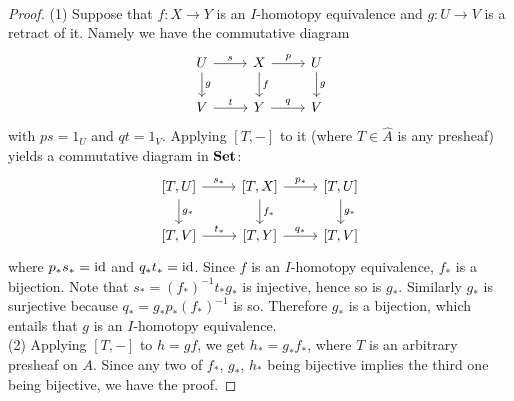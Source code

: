 \documentclass[a4paper,11pt,openany]{scrartcl}
\begin{document}
\ \\
\begin{proof}
(1) Suppose that $f\colon X\to Y$ is an $I$-homotopy equivalence and $g\colon U\to V$ is a retract of it. Namely we have the commutative diagram
\[
\begin{tikzcd}
U\arrow[r,"s"]\arrow[d,"g"]& X\arrow[r,"p"]\arrow[d,"f"]& U\arrow[d,"g"]\\
V\arrow[r,"t"]& Y\arrow[r,"q"]& V
\end{tikzcd}
\]
with $ps=1_U$ and $qt=1_V$. Applying $[T,-]$ to it (where $T\in\widehat{A}$ is any presheaf) yields a commutative diagram in $\operatorname{\mathbf{Set}}$:
\[
\begin{tikzcd}
\text{[}T,U\text{]}\arrow[r,"s_*"]\arrow[d,"g_*"]& \text{[}T,X\text{]}\arrow[r,"p_*"]\arrow[d,"f_*"]& \text{[}T,U\text{]}\arrow[d,"g_*"]\\
\text{[}T,V\text{]}\arrow[r,"t_*"]& \text{[}T,Y\text{]}\arrow[r,"q_*"]& \text{[}T,V\text{]}
\end{tikzcd}
\]
where $p_*s_*=\operatorname{id}$ and $q_*t_*=\operatorname{id}$. Since $f$ is an $I$-homotopy equivalence, $f_*$ is a bijection. Note that $s_*=(f_*)^{-1}t_*g_*$ is injective, hence so is $g_*$. Similarly $g_*$ is surjective because $q_*=g_*p_*(f_*)^{-1}$ is so. Therefore $g_*$ is a bijection, which entails that $g$ is an $I$-homotopy equivalence.\\

(2) Applying $[T,-]$ to $h=gf$, we get $h_*=g_*f_*$, where $T$ is an arbitrary presheaf on $A$. Since any two of $f_*$, $g_*$, $h_*$ being bijective implies the third one being bijective, we have the proof.
\end{proof}
\end{document}
